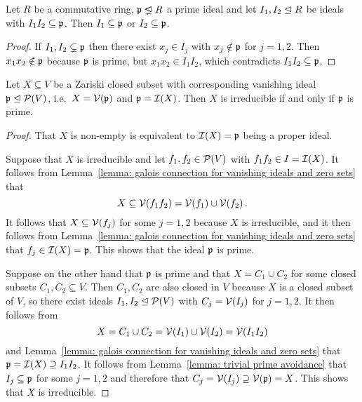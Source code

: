 \begin{lemma}
  \label{lemma: trivial prime avoidance}
  Let $R$ be a commutative ring, $\mf{p} \ideallneq R$ a prime ideal and let $I_1, I_2 \trianglelefteq R$ be ideals with $I_1 I_2 \subseteq \mathfrak{p}$.
  Then $I_1 \subseteq \mathfrak{p}$ or $I_2 \subseteq \mathfrak{p}$.
\end{lemma}


\begin{proof}
  If $I_1, I_2 \subsetneq \mathfrak{p}$ then there exist $x_j \in I_j$ with $x_j \notin \mathfrak{p}$ for $j = 1,2$.
  Then $x_1 x_2 \notin \mathfrak{p}$ because $\mathfrak{p}$ is prime, but $x_1 x_2 \in I_1 I_2$, which contradicts $I_1 I_2 \subseteq \mathfrak{p}$.
\end{proof}


\begin{lemma}
  \label{lemma: X is irreducible iff I(X) is prime}
  Let $X \subseteq V$ be a Zariski closed subset with corresponding vanishing ideal $\mathfrak{p} \trianglelefteq \mathcal{P}(V)$, i.e.\ $X = \mathcal{V}(\mathfrak{p})$ and $\mathfrak{p} = \mathcal{I}(X)$.
  Then $X$ is irreducible if and only if $\mathfrak{p}$ is prime.
\end{lemma}


\begin{proof}
  That $X$ is non-empty is equivalent to $\mathcal{I}(X) = \mathfrak{p}$ being a proper ideal.
  
  Suppose that $X$ is irreducible and let $f_1, f_2 \in \mathcal{P}(V)$ with $f_1 f_2 \in I = \mathcal{I}(X)$.
  It follows from Lemma~\ref{lemma: galois connection for vanishing ideals and zero sets} that
  \[
              X
    \subseteq \mathcal{V}(f_1 f_2)
    =         \mathcal{V}(f_1) \cup \mathcal{V}(f_2) \,.
  \]
  It follows that $X \subseteq \mathcal{V}(f_j)$ for some $j = 1,2$ because $X$ is irreducible, and it then follows from Lemma~\ref{lemma: galois connection for vanishing ideals and zero sets} that $f_j \in \mathcal{I}(X) = \mathfrak{p}$.
  This shows that the ideal $\mathfrak{p}$ is prime.
  
  Suppose on the other hand that $\mathfrak{p}$ is prime and that $X = C_1 \cup C_2$ for some closed subsets $C_1, C_2 \subseteq V$.
  Then $C_1, C_2$ are also closed in $V$ because $X$ is a closed subset of $V$, so there exist ideals $I_1, I_2 \trianglelefteq \mathcal{P}(V)$ with $C_j = \mathcal{V}(I_j)$ for $j = 1,2$.
  It then follows from
  \[
      X
    = C_1 \cup C_2
    = \mathcal{V}(I_1) \cup \mathcal{V}(I_2)
    = \mathcal{V}(I_1 I_2)
  \]
  and Lemma~\ref{lemma: galois connection for vanishing ideals and zero sets} that $\mathfrak{p} = \mathcal{I}(X) \supseteq I_1 I_2$.
  It follows from Lemma~\ref{lemma: trivial prime avoidance} that $I_j \subseteq \mathfrak{p}$ for some $j = 1,2$ and therefore that $C_j = \mathcal{V}(I_j) \supseteq \mathcal{V}(\mathfrak{p}) = X$.
  This shows that $X$ is irreducible.
\end{proof}


